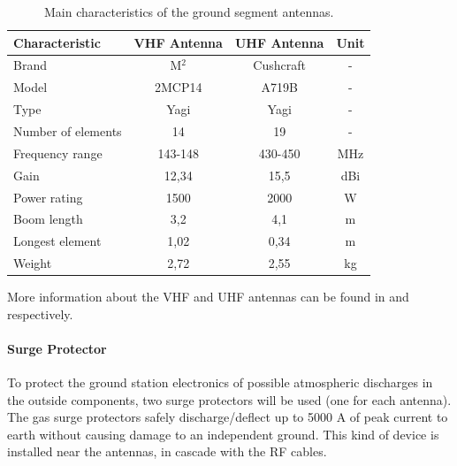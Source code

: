 \begin{table}[ht]
    \centering
    \begin{tabular}{lccc}
        \toprule[1.5pt]
        \textbf{Characteristic} & \textbf{VHF Antenna}  & \textbf{UHF Antenna}  & \textbf{Unit} \\
        \midrule
        Brand                   & M$^{2}$               & Cushcraft             & - \\
        Model                   & 2MCP14                & A719B                 & - \\
        Type                    & Yagi                  & Yagi                  & - \\
        Number of elements      & 14                    & 19                    & - \\
        Frequency range         & 143-148               & 430-450               & MHz \\
        Gain                    & 12,34                 & 15,5                  & dBi \\
        Power rating            & 1500                  & 2000                  & W \\
        Boom length             & 3,2                   & 4,1                   & m \\
        Longest element         & 1,02                  & 0,34                  & m \\
        Weight                  & 2,72                  & 2,55                  & kg \\
        \bottomrule[1.5pt]
    \end{tabular}
    \caption{Main characteristics of the ground segment antennas.}
    \label{tab:grs-antennas}
\end{table}

More information about the VHF and UHF antennas can be found in \cite{2mcp14} and \cite{a719b} respectively.

\paragraph{Surge Protector}

To protect the ground station electronics of possible atmospheric discharges in the outside components, two surge protectors will be used (one for each antenna). The gas surge protectors safely discharge/deflect up to 5000 A of peak current to earth without causing damage to an independent ground. This kind of device is installed near the antennas, in cascade with the RF cables.

